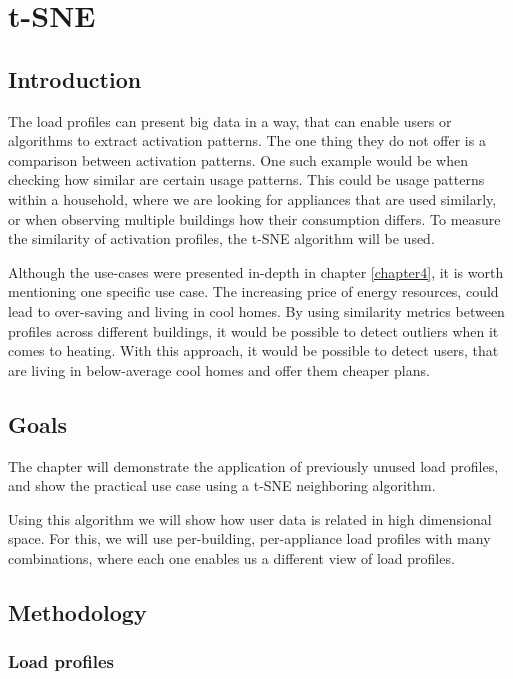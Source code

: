 \chapter{t-SNE} 

\label{Chapter8} 

\section{Introduction}

The load profiles can present big data in a way, that can enable users or algorithms to extract activation patterns.
The one thing they do not offer is a comparison between activation patterns.
One such example would be when checking how similar are certain usage patterns.
This could be usage patterns within a household, where we are looking for appliances that are used similarly,
or when observing multiple buildings how their consumption differs. 
To measure the similarity of activation profiles, the t-SNE algorithm will be used.

Although the use-cases were presented in-depth in chapter \ref{chapter4}, it is worth mentioning one specific use case.
The increasing price of energy resources, could lead to over-saving and living in cool homes.
By using similarity metrics between profiles across different buildings, it would be possible to detect outliers when it comes to heating. 
With this approach, it would be possible to detect users, that are living in below-average cool homes and offer them cheaper plans. 

\section{Goals}

The chapter will demonstrate the application of previously unused load profiles,
and show the practical use case using a t-SNE neighboring algorithm.

Using this algorithm we will show how user data is related in high dimensional space.
For this, we will use per-building, per-appliance load profiles with many combinations, where
each one enables us a different view of load profiles. 

\section{Methodology}

\subsection{Load profiles}

